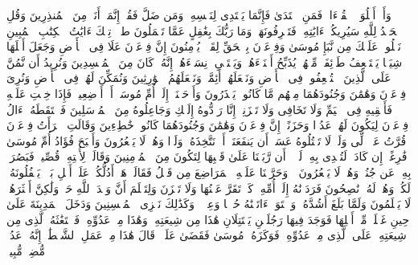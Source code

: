 \startbuffer[\q:27:92]
وَأَنۡ أَتۡلُوَا۟ ٱلۡقُرۡءَانَۖ فَمَنِ ٱهۡتَدَىٰ فَإِنَّمَا یَهۡتَدِی لِنَفۡسِهِۦۖ وَمَن ضَلَّ فَقُلۡ إِنَّمَاۤ أَنَا۠ مِنَ ٱلۡمُنذِرِینَ%
\stopbuffer
\startbuffer[\q:27:93]
وَقُلِ ٱلۡحَمۡدُ لِلَّهِ سَیُرِیكُمۡ ءَایَٰتِهِۦ فَتَعۡرِفُونَهَاۚ وَمَا رَبُّكَ بِغَٰفِلٍ عَمَّا تَعۡمَلُونَ%
\stopbuffer
\startbuffer[\q:28:1]
طسۤمۤ%
\stopbuffer
\startbuffer[\q:28:2]
تِلۡكَ ءَایَٰتُ ٱلۡكِتَٰبِ ٱلۡمُبِینِ%
\stopbuffer
\startbuffer[\q:28:3]
نَتۡلُوا۟ عَلَیۡكَ مِن نَّبَإِ مُوسَىٰ وَفِرۡعَوۡنَ بِٱلۡحَقِّ لِقَوۡمࣲ یُؤۡمِنُونَ%
\stopbuffer
\startbuffer[\q:28:4]
إِنَّ فِرۡعَوۡنَ عَلَا فِی ٱلۡأَرۡضِ وَجَعَلَ أَهۡلَهَا شِیَعࣰا یَسۡتَضۡعِفُ طَاۤئِفَةࣰ مِّنۡهُمۡ یُذَبِّحُ أَبۡنَاۤءَهُمۡ وَیَسۡتَحۡیِۦ نِسَاۤءَهُمۡۚ إِنَّهُۥ كَانَ مِنَ ٱلۡمُفۡسِدِینَ%
\stopbuffer
\startbuffer[\q:28:5]
وَنُرِیدُ أَن نَّمُنَّ عَلَى ٱلَّذِینَ ٱسۡتُضۡعِفُوا۟ فِی ٱلۡأَرۡضِ وَنَجۡعَلَهُمۡ أَئِمَّةࣰ وَنَجۡعَلَهُمُ ٱلۡوَٰرِثِینَ%
\stopbuffer
\startbuffer[\q:28:6]
وَنُمَكِّنَ لَهُمۡ فِی ٱلۡأَرۡضِ وَنُرِیَ فِرۡعَوۡنَ وَهَٰمَٰنَ وَجُنُودَهُمَا مِنۡهُم مَّا كَانُوا۟ یَحۡذَرُونَ%
\stopbuffer
\startbuffer[\q:28:7]
وَأَوۡحَیۡنَاۤ إِلَىٰۤ أُمِّ مُوسَىٰۤ أَنۡ أَرۡضِعِیهِۖ فَإِذَا خِفۡتِ عَلَیۡهِ فَأَلۡقِیهِ فِی ٱلۡیَمِّ وَلَا تَخَافِی وَلَا تَحۡزَنِیۤۖ إِنَّا رَاۤدُّوهُ إِلَیۡكِ وَجَاعِلُوهُ مِنَ ٱلۡمُرۡسَلِینَ%
\stopbuffer
\startbuffer[\q:28:8]
فَٱلۡتَقَطَهُۥۤ ءَالُ فِرۡعَوۡنَ لِیَكُونَ لَهُمۡ عَدُوࣰّا وَحَزَنًاۗ إِنَّ فِرۡعَوۡنَ وَهَٰمَٰنَ وَجُنُودَهُمَا كَانُوا۟ خَٰطِءِینَ%
\stopbuffer
\startbuffer[\q:28:9]
وَقَالَتِ ٱمۡرَأَتُ فِرۡعَوۡنَ قُرَّتُ عَیۡنࣲ لِّی وَلَكَۖ لَا تَقۡتُلُوهُ عَسَىٰۤ أَن یَنفَعَنَاۤ أَوۡ نَتَّخِذَهُۥ وَلَدࣰا وَهُمۡ لَا یَشۡعُرُونَ%
\stopbuffer
\startbuffer[\q:28:10]
وَأَصۡبَحَ فُؤَادُ أُمِّ مُوسَىٰ فَٰرِغًاۖ إِن كَادَتۡ لَتُبۡدِی بِهِۦ لَوۡلَاۤ أَن رَّبَطۡنَا عَلَىٰ قَلۡبِهَا لِتَكُونَ مِنَ ٱلۡمُؤۡمِنِینَ%
\stopbuffer
\startbuffer[\q:28:11]
وَقَالَتۡ لِأُخۡتِهِۦ قُصِّیهِۖ فَبَصُرَتۡ بِهِۦ عَن جُنُبࣲ وَهُمۡ لَا یَشۡعُرُونَ%
\stopbuffer
\startbuffer[\q:28:12]
۞ وَحَرَّمۡنَا عَلَیۡهِ ٱلۡمَرَاضِعَ مِن قَبۡلُ فَقَالَتۡ هَلۡ أَدُلُّكُمۡ عَلَىٰۤ أَهۡلِ بَیۡتࣲ یَكۡفُلُونَهُۥ لَكُمۡ وَهُمۡ لَهُۥ نَٰصِحُونَ%
\stopbuffer
\startbuffer[\q:28:13]
فَرَدَدۡنَٰهُ إِلَىٰۤ أُمِّهِۦ كَیۡ تَقَرَّ عَیۡنُهَا وَلَا تَحۡزَنَ وَلِتَعۡلَمَ أَنَّ وَعۡدَ ٱللَّهِ حَقࣱّ وَلَٰكِنَّ أَكۡثَرَهُمۡ لَا یَعۡلَمُونَ%
\stopbuffer
\startbuffer[\q:28:14]
وَلَمَّا بَلَغَ أَشُدَّهُۥ وَٱسۡتَوَىٰۤ ءَاتَیۡنَٰهُ حُكۡمࣰا وَعِلۡمࣰاۚ وَكَذَٰلِكَ نَجۡزِی ٱلۡمُحۡسِنِینَ%
\stopbuffer
\startbuffer[\q:28:15]
وَدَخَلَ ٱلۡمَدِینَةَ عَلَىٰ حِینِ غَفۡلَةࣲ مِّنۡ أَهۡلِهَا فَوَجَدَ فِیهَا رَجُلَیۡنِ یَقۡتَتِلَانِ هَٰذَا مِن شِیعَتِهِۦ وَهَٰذَا مِنۡ عَدُوِّهِۦۖ فَٱسۡتَغَٰثَهُ ٱلَّذِی مِن شِیعَتِهِۦ عَلَى ٱلَّذِی مِنۡ عَدُوِّهِۦ فَوَكَزَهُۥ مُوسَىٰ فَقَضَىٰ عَلَیۡهِۖ قَالَ هَٰذَا مِنۡ عَمَلِ ٱلشَّیۡطَٰنِۖ إِنَّهُۥ عَدُوࣱّ مُّضِلࣱّ مُّبِینࣱ%
